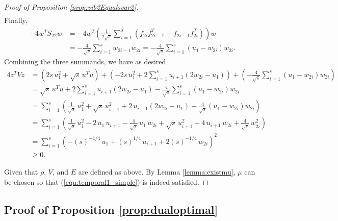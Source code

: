 \documentclass[12pt]{article}
\newcommand{\Null}{\mathrm{Null}}
\begin{document}
\begin{onehalfspace}
\begin{proof}[Proof of Proposition \ref{prop:vib2Equalsvar2}]
\begin{align*}
\end{align*}
Finally, 
\begin{align*}
    - 4 w^T S_{22} w
    &= -4 w^T \left( \frac{1}{2\sqrt{s}} \sum_{i=1}^{s}
    \left( f_{2i}f_{2i-1}^T + f_{2i-1}f_{2i}^T \right) \right) w \\
    &= -\frac{4}{\sqrt{s}} \sum_{i=1}^{s} w_{2i - 1} w_{2i} 
     = -\frac{4}{\sqrt{s}} \sum_{i=1}^{s} (u_1 - w_{2i}) w_{2i}.
\end{align*}
Combining the three summands, we have as desired
\begin{align*}
    4 z^T Vz 
    &= \left( 2s \, u_1^2 + \sqrt{s} \, u^T u \right) +
    \left( -2s \, u_1^2 + 2 \sum_{i = 1}^{s} u_{i+1}(2w_{2i} - u_1) \right) +
    \left( -\frac{4}{\sqrt{s}} \sum_{i=1}^{s} (u_1 - w_{2i}) w_{2i} \right) \\
    &= \sqrt{s} \, u^T u + 2 \sum_{i = 1}^{s} u_{i+1}(2 w_{2i} - u_1)
    -\frac{4}{\sqrt{s}} \sum_{i=1}^{s} (u_1 - w_{2i}) w_{2i} \\
    &= \sum_{i = 1}^{s} \left(
    \frac{1}{\sqrt{s}}  \, u_1^2 + \sqrt{s} \, u_{i+1}^2 + 2 \, u_{i+1}(2 w_{2i} - u_1)
    -\frac{4}{\sqrt{s}}  (u_1 - w_{2i}) w_{2i}
    \right) \\
    &= \sum_{i = 1}^{s} \left(
    \frac{1}{\sqrt{s}}  \, u_1^2 - 2 \, u_1 \, u_{i+1}
    -\frac{4}{\sqrt{s}}  \, u_1 \, w_{2i} + \sqrt{s} \, u_{i+1}^2 + 4 \, u_{i+1} \, w_{2i}
    + \frac{4}{\sqrt{s}}  \, w_{2i}^2 
    \right) \\
    &= \sum_{i=1}^{s} \left(
        -  (s)^{-1/4}  \, u_1 + (s)^{1/4} \, u_{i+1} + 2(s)^{-1/4}  \, w_{2i}
    \right)^2 \\
    &\ge 0.
\end{align*}

Given that $\rho$, $V$, and $E$ are defined as above. By
Lemma \ref{lemma:existmu}, $\mu$ can be chosen so that 
(\ref{equ:temporal1_simple}) is indeed satisfied.
\end{proof}


\subsection{Proof of Proposition \ref{prop:dualoptimal}}


\end{onehalfspace}
\end{document}
